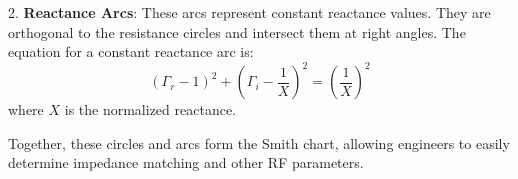 2. \textbf{Reactance Arcs}: These arcs represent constant reactance values. They are orthogonal to the resistance circles and intersect them at right angles. The equation for a constant reactance arc is:
   \[
   \left( \Gamma_r - 1 \right)^2 + \left( \Gamma_i - \frac{1}{X} \right)^2 = \left( \frac{1}{X} \right)^2
   \]
   where \( X \) is the normalized reactance.

Together, these circles and arcs form the Smith chart, allowing engineers to easily determine impedance matching and other RF parameters.


